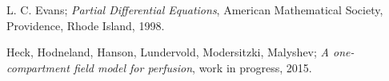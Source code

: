 \documentclass[paper=a4, fontsize=12pt,parskip=half,draft,headings=small]{scrartcl}
\begin{document}
		
		
	\begin{thebibliography}{9}
		L. C. Evans;
		\emph{Partial Differential Equations},
		American Mathematical Society,
		Providence, Rhode Island,
		1998.
		
		Heck, Hodneland, Hanson, Lundervold, Modersitzki, Malyshev;
		\emph{A one-compartment field model for perfusion},
		work in progress,
		2015.
	\end{thebibliography}
	
	\begin{flushright}
		\signature{28ex}
	\end{flushright}
\end{document}
